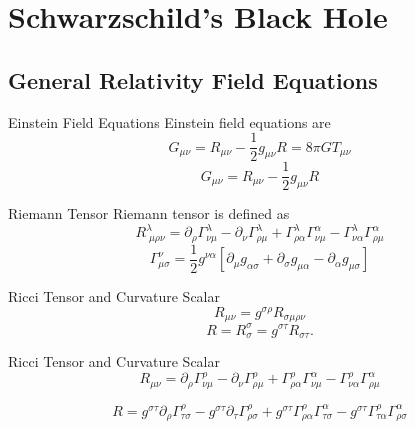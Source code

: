 \documentclass{beamer}
\begin{document}
  	\section{Schwarzschild's Black Hole}
  	\begin{darkframes}
  
    	\subsection{General Relativity Field Equations}

    	\begin{frame}{Einstein Field Equations}
    		Einstein field equations are 
			$$ G_{\mu\nu} = R_{\mu\nu} - \frac{1}{2}g_{\mu\nu}R = 8\pi GT_{\mu\nu} $$
        	\pause
        	$$ G_{\mu\nu} = R_{\mu\nu} - \frac{1}{2}g_{\mu\nu}R $$
    	\end{frame}
        
    	\begin{frame}{Riemann Tensor}
    		Riemann tensor is defined as
			$$ R_{\;\mu\rho\nu}^{\lambda} = 
            \partial_{\rho}\Gamma_{\nu\mu}^{\lambda}-	
            \partial_{\nu}\Gamma_{\rho\mu}^{\lambda}+ 
            \Gamma_{\rho\alpha}^{\lambda}\Gamma_{\nu\mu}^{\alpha}-
            \Gamma_{\nu\alpha}^{\lambda}\Gamma_{\rho\mu}^{\alpha}$$  
            \pause
            $$ \Gamma^{\nu}_{\mu \sigma} = \frac{1}{2} g^{\nu \alpha} \left[ 
            \partial_{\mu} g_{\alpha \sigma} + 
            \partial_{\sigma} g_{\mu \alpha} - 
            \partial_{\alpha} g_{\mu \sigma} \right] $$
    	\end{frame}

		\begin{frame}{Ricci Tensor and Curvature Scalar}	
			$$R_{\mu\nu}=g^{\sigma\rho}R_{\sigma\mu\rho\nu}$$
    		$$R = R_{\sigma}^{\sigma} = g^{\sigma\tau}R_{\sigma\tau}. $$
    	\end{frame}
        
        \begin{frame}{Ricci Tensor and Curvature Scalar}	
			$$R_{\mu\nu}=\partial_{\rho}\Gamma_{\nu\mu}^{\rho}-	
            \partial_{\nu}\Gamma_{\rho\mu}^{\rho}+ 
            \Gamma_{\rho\alpha}^{\rho}\Gamma_{\nu\mu}^{\alpha}-
            \Gamma_{\nu\alpha}^{\rho}\Gamma_{\rho\mu}^{\alpha}$$
            
    		$$R = g^{\sigma\tau}\partial_{\rho}\Gamma_{\tau\sigma}^{\rho}-	
            g^{\sigma\tau}\partial_{\tau}\Gamma_{\rho\sigma}^{\rho}+ 
            g^{\sigma\tau}\Gamma_{\rho\alpha}^{\rho}\Gamma_{\tau\sigma}^{\alpha}-
            g^{\sigma\tau}\Gamma_{\tau\alpha}^{\rho}\Gamma_{\rho\sigma}^{\alpha}$$
    	\end{frame}
    	

\end{darkframes}
\end{document}
